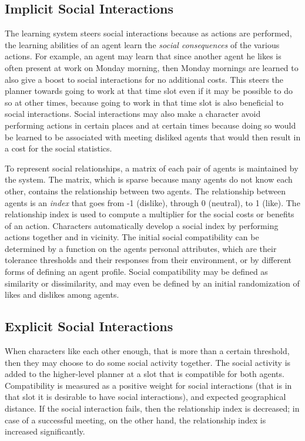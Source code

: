 \subsection{Implicit Social Interactions}
The learning system steers social interactions because as actions are performed, the learning abilities of an agent learn the \textit{social consequences} of the various actions. For example, an agent may learn that since another agent he likes is often present at work on Monday morning, then Monday mornings are learned to also give a boost to social interactions for no additional costs. This steers the planner towards going to work at that time slot even if it may be possible to do so at other times, because going to work in that time slot is also beneficial to social interactions. Social interactions may also make a character avoid performing actions in certain places and at certain times because doing so would be learned to be associated with meeting disliked agents that would then result in a cost for the social statistics.

To represent social relationships, a matrix of each pair of agents is maintained by the system. The matrix, which is sparse because many agents do not know each other, contains the relationship between two agents. The relationship between agents is an \textit{index} that goes from -1 (dislike), through 0 (neutral), to 1 (like). The relationship index is used to compute a multiplier for the social costs or benefits of an action. Characters automatically develop a social index by performing actions together and in vicinity. The initial social compatibility can be determined by a function on the agents personal attributes, which are their tolerance thresholds and their responses from their environment, or by different forms of defining an agent profile. Social compatibility may be defined as similarity or dissimilarity, and may even be defined by an initial randomization of likes and dislikes among agents.


\subsection{Explicit Social Interactions}
When characters like each other enough, that is more than a certain threshold, then they may choose to do some social activity together. The social activity is added to the higher-level planner at a slot that is compatible for both agents. Compatibility is measured as a positive weight for social interactions (that is in that slot it is desirable to have social interactions), and expected geographical distance. If the social interaction fails, then the relationship index is decreased; in case of a successful meeting, on the other hand, the relationship index is increased significantly.



